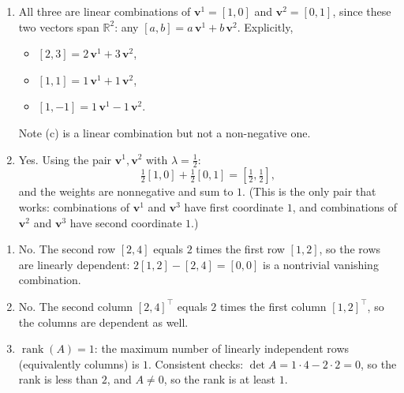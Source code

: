 \begin{enumerate}
\item All three are linear combinations of $\mathbf{v}^1 = [1,0]$ and $\mathbf{v}^2 = [0,1]$, since these two vectors span $\mathbb{R}^2$: any $[a, b] = a\,\mathbf{v}^1 + b\,\mathbf{v}^2$. Explicitly,
\begin{itemize}
\item[(a)] $[2,3] = 2\,\mathbf{v}^1 + 3\,\mathbf{v}^2$,
\item[(b)] $[1,1] = 1\,\mathbf{v}^1 + 1\,\mathbf{v}^2$,
\item[(c)] $[1,-1] = 1\,\mathbf{v}^1 - 1\,\mathbf{v}^2$.
\end{itemize}
Note (c) is a linear combination but not a non-negative one.
\item Yes. Using the pair $\mathbf{v}^1, \mathbf{v}^2$ with $\lambda = \tfrac12$:
\[
\tfrac12 [1, 0] + \tfrac12 [0, 1] = [\tfrac12, \tfrac12],
\]
and the weights are nonnegative and sum to $1$. (This is the only pair that works: combinations of $\mathbf{v}^1$ and $\mathbf{v}^3$ have first coordinate $1$, and combinations of $\mathbf{v}^2$ and $\mathbf{v}^3$ have second coordinate $1$.)
\end{enumerate}

\begin{enumerate}
\item No. The second row $[2,4]$ equals $2$ times the first row $[1,2]$, so the rows are linearly dependent: $2[1,2] - [2,4] = [0,0]$ is a nontrivial vanishing combination.
\item No. The second column $[2,4]^\top$ equals $2$ times the first column $[1,2]^\top$, so the columns are dependent as well.
\item $\operatorname{rank}(A) = 1$: the maximum number of linearly independent rows (equivalently columns) is $1$. Consistent checks: $\det A = 1\cdot 4 - 2 \cdot 2 = 0$, so the rank is less than $2$, and $A \neq 0$, so the rank is at least $1$.
\end{enumerate}

